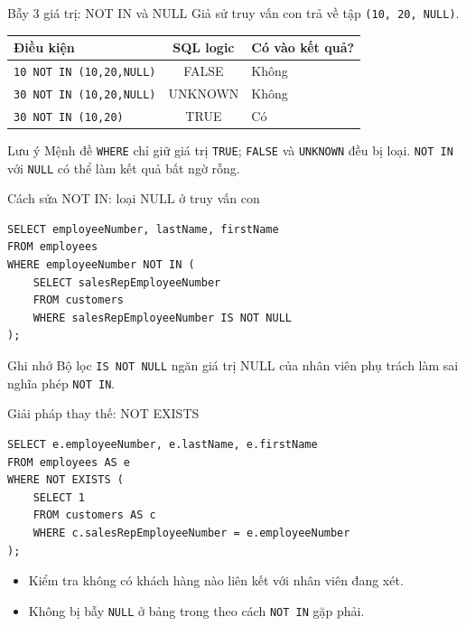 \documentclass[aspectratio=169,10pt]{beamer}
\newcommand{\code}[1]{\texttt{#1}}
\begin{document}
\begin{frame}[fragile]{Bẫy 3 giá trị: NOT IN và NULL}
\small Giả sử truy vấn con trả về tập \code{(10, 20, NULL)}.
\begin{center}
\begin{tabular}{l c l}\toprule
Điều kiện & SQL logic & Có vào kết quả?\\\midrule
\code{10 NOT IN (10,20,NULL)} & FALSE & Không\\
\code{30 NOT IN (10,20,NULL)} & UNKNOWN & Không\\
\code{30 NOT IN (10,20)} & TRUE & Có\\\bottomrule
\end{tabular}
\end{center}
\begin{alertblock}{Lưu ý}
\small Mệnh đề \code{WHERE} chỉ giữ giá trị \code{TRUE}; \code{FALSE} và \code{UNKNOWN} đều bị loại. \code{NOT IN} với \code{NULL} có thể làm kết quả bất ngờ rỗng.
\end{alertblock}
\end{frame}

\begin{frame}[fragile]{Cách sửa NOT IN: loại NULL ở truy vấn con}
\begin{lstlisting}
SELECT employeeNumber, lastName, firstName
FROM employees
WHERE employeeNumber NOT IN (
    SELECT salesRepEmployeeNumber
    FROM customers
    WHERE salesRepEmployeeNumber IS NOT NULL
);
\end{lstlisting}
\begin{block}{Ghi nhớ}
\small Bộ lọc \code{IS NOT NULL} ngăn giá trị NULL của nhân viên phụ trách làm sai nghĩa phép \code{NOT IN}.
\end{block}
\end{frame}

\begin{frame}[fragile]{Giải pháp thay thế: NOT EXISTS}
\begin{lstlisting}
SELECT e.employeeNumber, e.lastName, e.firstName
FROM employees AS e
WHERE NOT EXISTS (
    SELECT 1
    FROM customers AS c
    WHERE c.salesRepEmployeeNumber = e.employeeNumber
);
\end{lstlisting}
\begin{itemize}
\item Kiểm tra không có khách hàng nào liên kết với nhân viên đang xét.
\item Không bị bẫy \code{NULL} ở bảng trong theo cách \code{NOT IN} gặp phải.
\end{itemize}
\end{frame}
\end{document}
